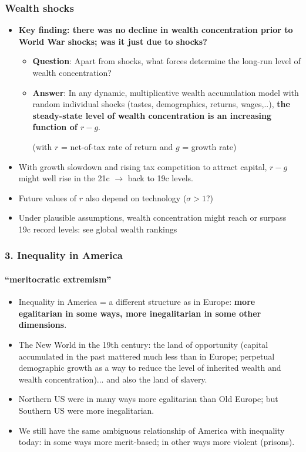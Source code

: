 \begin{frame}[label=WealthShocks]
\frametitle{Wealth shocks}
\begin{itemize}
\item
\textbf{Key finding: there was no decline in wealth concentration prior to World War shocks; was it just due to shocks?}
\begin{itemize}
\item
\textbf{Question}: Apart from shocks, what forces determine the long-run level of wealth concentration?
\item
\textbf{Answer}: In any dynamic, multiplicative wealth accumulation model with random individual shocks (tastes, demographics, returns, wages,..), 
\textbf{the steady-state level of wealth concentration is an increasing function of $r-g$}. 
\smallskip\par (with $r$ = net-of-tax rate of return and $g$ = growth rate)
\end{itemize}
\item
With growth slowdown and rising tax competition to attract capital, $r-g$ might well rise in the 21c $\rightarrow$ back to 19c levels.
\item
Future values of $r$ also depend on technology ($\sigma > 1$?)
\item 
Under plausible assumptions, wealth concentration might reach or surpass 19c record levels: see global wealth rankings
\end{itemize}
\end{frame}


\begin{frame}[label=InequalityUSA]
\frametitle{3. Inequality in America}
\framesubtitle{``meritocratic extremism''}
\begin{itemize}
\item
Inequality in America = a different structure as in Europe: 
\textbf{more egalitarian in some ways, more inegalitarian in some other dimensions}.
\item
The New World in the 19th century: the land of opportunity (capital accumulated in the past mattered much less than in Europe; perpetual demographic growth as a way to reduce the level of inherited wealth and wealth concentration)... and also the land of slavery.
\item 
Northern US were in many ways more egalitarian than Old Europe; but Southern US were more inegalitarian.
\item 
We still have the same ambiguous relationship of America with inequality today: in some ways more merit-based; in other ways more violent (prisons).
\end{itemize}
\end{frame}


